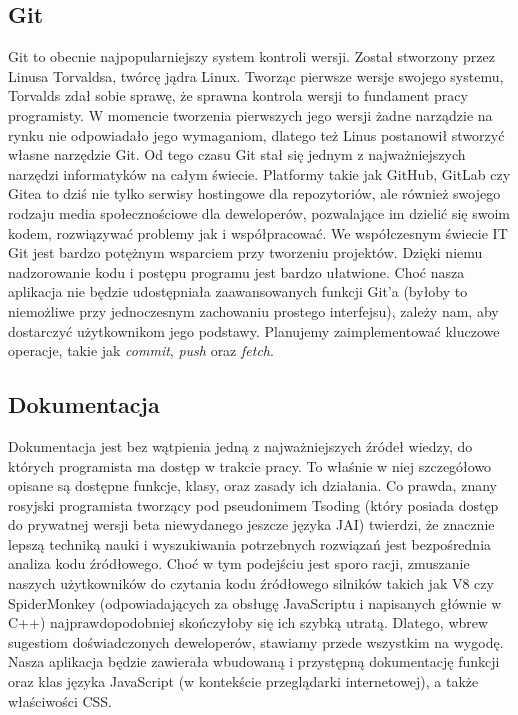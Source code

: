 \subsection{Git}
Git to obecnie najpopularniejszy system kontroli wersji. Został stworzony przez Linusa Torvaldsa, twórcę jądra Linux. Tworząc pierwsze wersje swojego systemu, Torvalds zdał sobie sprawę, że sprawna kontrola wersji to fundament pracy programisty. W momencie tworzenia pierwszych jego wersji żadne narządzie na rynku nie odpowiadało jego wymaganiom, dlatego też Linus postanowił stworzyć własne narzędzie Git.
\newline\newline
Od tego czasu Git stał się jednym z najważniejszych narzędzi informatyków na całym świecie. Platformy takie jak GitHub, GitLab czy Gitea to dziś nie tylko serwisy hostingowe dla repozytoriów, ale również swojego rodzaju media społecznościowe dla deweloperów, pozwalające im dzielić się swoim kodem, rozwiązywać problemy jak i współpracować.
\newline\newline
We współczesnym świecie IT Git jest bardzo potężnym wsparciem przy tworzeniu projektów. Dzięki niemu nadzorowanie kodu i postępu programu jest bardzo ułatwione. Choć nasza aplikacja nie będzie udostępniała zaawansowanych funkcji Git'a (byłoby to niemożliwe przy jednoczesnym zachowaniu prostego interfejsu), zależy nam, aby dostarczyć użytkownikom jego podstawy. Planujemy zaimplementować kluczowe operacje, takie jak \textit{commit}, \textit{push} oraz \textit{fetch}.
\subsection{Dokumentacja}
Dokumentacja jest bez wątpienia jedną z najważniejszych źródeł wiedzy, do których programista ma dostęp w trakcie pracy. To właśnie w niej szczegółowo opisane są dostępne funkcje, klasy, oraz zasady ich działania. Co prawda, znany rosyjski programista tworzący pod pseudonimem Tsoding (który posiada dostęp do prywatnej wersji beta niewydanego jeszcze języka JAI) twierdzi, że znacznie lepszą techniką nauki i wyszukiwania potrzebnych rozwiązań jest bezpośrednia analiza kodu źródłowego.
\newline\newline
Choć w tym podejściu jest sporo racji, zmuszanie naszych użytkowników do czytania kodu źródłowego silników takich jak V8 czy SpiderMonkey (odpowiadających za obsługę JavaScriptu i napisanych głównie w C++) najprawdopodobniej skończyłoby się ich szybką utratą. Dlatego, wbrew sugestiom doświadczonych deweloperów, stawiamy przede wszystkim na wygodę. Nasza aplikacja będzie zawierała wbudowaną i przystępną dokumentację funkcji oraz klas języka JavaScript (w kontekście przeglądarki internetowej), a także właściwości CSS.
